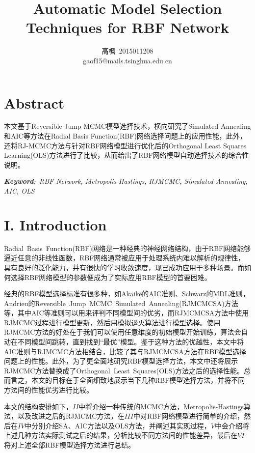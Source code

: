 \documentclass[twocolumn]{article}
\title{\textbf{Automatic Model Selection Techniques for RBF Network}}
\author{高枫\ 2015011208 \\
gaof15@mails.tsinghua.edu.cn}
\date{}
\begin{document}
\maketitle

\section*{\centering Abstract}

本文基于Reversible Jump MCMC模型选择技术，横向研究了Simulated  Annealing和AIC等方法在Radial Basis Function(RBF)网络选择问题上的应用性能，此外，还将RJ-MCMC方法与针对RBF网络模型进行优化后的Orthogonal Least Squares Learning(OLS)方法进行了比较，从而给出了RBF网络模型自动选择技术的综合性说明。

\textit{\textbf{Keyword}:\ RBF Network, Metropolis-Hastings, RJMCMC, Simulated Annealing, AIC, OLS}

\section*{\centering I. Introduction}

Radial\ Basis\ Function(RBF)网络是一种经典的神经网络结构，由于RBF网络能够逼近任意的非线性函数，RBF网络通常被应用于处理系统内难以解析的规律性，具有良好的泛化能力，并有很快的学习收敛速度，现已成功应用于多种场景。而如何选择RBF网络模型的参数便成为了实际应用RBF模型的首要困难。

经典的RBF模型选择标准有很多种，如Akaike的AIC准则\cite{1100705}、Schwarz的MDL准则\cite{MDL}，Andrieu的Reversible\ Jump\ MCMC\ Simulated\ Annealing(RJMCMCSA)方法\cite{DBLP}等，其中AIC等准则可以用来评判不同模型间的优劣，而RJMCMCSA方法中使用RJMCMC过程进行模型更新，然后用模拟退火算法进行模型选择。使用RJMCMC方法的好处在于我们可以使用任意维度的初始模型开始训练，算法会自动在不同模型间跳转，直到找到“最优”模型。鉴于这种方法的优越性，本文中将AIC准则与RJMCMC方法相结合，比较了其与RJMCMCSA方法在RBF模型选择问题上的性能。此外，为了更全面地研究RBF模型选择方法，本文中还将展示RJMCMC方法替换成了Orthogonal\ Least\ Squares(OLS)方法\cite{80341}之后的选择性能。总而言之，本文的目标在于全面细致地展示当下几种RBF模型选择方法，并将不同方法间的性能优劣进行比较。

本文的结构安排如下，$II$中将介绍一种传统的MCMC方法，Metropolis-Hastings算法，以及改进之后的RJMCMC方法，在$III$中对RBF网络模型进行简单的介绍，然后在$IV$中分别介绍SA、AIC方法以及OLS方法，并阐述其实现过程，$V$中会介绍将上述几种方法实际测试之后的结果，分析比较不同方法间的性能差异，最后在$VI$将对上述全部RBF模型选择方法进行总结。
\end{document}
